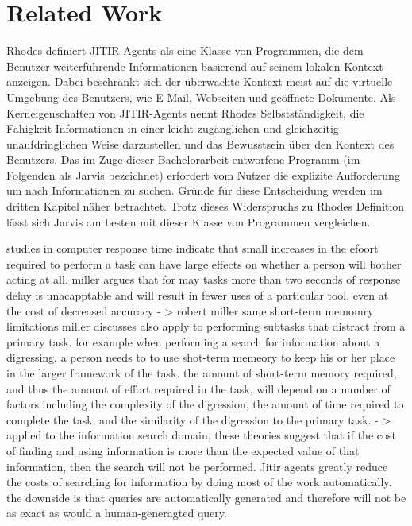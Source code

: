 \section{Related Work}
Rhodes\cite{rhodes2000just} definiert JITIR-Agents als eine Klasse von Programmen, die dem Benutzer weiterführende Informationen basierend auf seinem lokalen Kontext anzeigen. Dabei beschränkt sich der überwachte Kontext meist auf die virtuelle Umgebung des Benutzers, wie E-Mail, Webseiten und geöffnete Dokumente. Als Kerneigenschaften von JITIR-Agents nennt Rhodes Selbstständigkeit, die Fähigkeit Informationen in einer leicht zugänglichen und gleichzeitig unaufdringlichen Weise darzustellen und das Bewusstsein über den Kontext des Benutzers\cite{rhodes2000just}.
Das im Zuge dieser Bachelorarbeit entworfene Programm (im Folgenden als Jarvis bezeichnet) erfordert vom Nutzer die explizite Aufforderung um nach Informationen zu suchen. Gründe für diese Entscheidung werden im dritten Kapitel näher betrachtet. Trotz dieses Widerspruchs zu Rhodes Definition lässt sich Jarvis am besten mit dieser Klasse von Programmen vergleichen.



studies in computer response time indicate that small increases in the efoort required to perform a task can have large effects on whether a person will bother acting at all.
miller argues that for may tasks more than two seconds of response delay is unacapptable and will result in fewer uses of a particular tool, even at the cost of decreased accuracy - > robert miller
same short-term memomry limitations miller discusses also apply to performing subtasks that distract from a primary task. for example when performing a search for information about a digressing, a person needs to to use shot-term memeory to keep his or her place in the larger framework of the task. the amount of short-term memory required, and thus the amount of effort required in the task, will depend on a number of factors including the complexity of the digression, the amount of time required to complete the task, and the similarity of the digression to the primary task.
- > applied to the information search domain, these theories suggest that if the cost of finding and using information is more than the expected value of that information, then the search will not be performed.
Jitir agents greatly reduce the costs of searching for information by doing most of the work automatically. the downside is that queries are automatically generated and therefore will not be as exact as would a human-generagted query.

